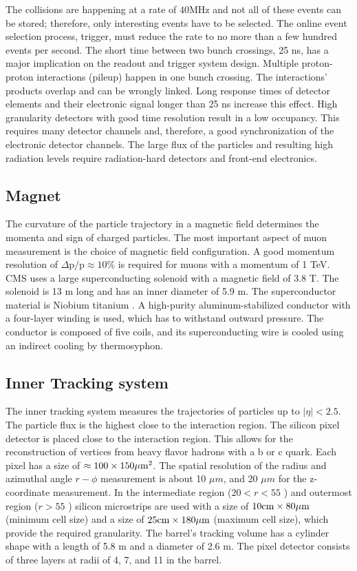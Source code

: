 The collisions are happening at a rate of $40 \mathrm{MHz}$ and not all of these events can be stored; therefore, only interesting events have to be selected. The online event selection process, trigger, must reduce the rate to no more than a few hundred events per second. The short time between two bunch crossings, 25 ns, has a major implication on the readout and trigger system design. Multiple proton-proton interactions (pileup) happen in one bunch crossing. The interactions' products overlap and can be wrongly linked. Long response times of detector elements and their electronic signal longer than 25 ns increase this effect. High granularity detectors with good time resolution result in a low occupancy. This requires many detector channels and, therefore, a good synchronization of the electronic detector channels. The large flux of the particles and resulting high radiation levels require radiation-hard detectors and front-end electronics.

\subsection{Magnet}

The curvature of the particle trajectory in a magnetic field determines the momenta and sign of charged particles. The most important aspect of muon measurement is the choice of magnetic field configuration. A good momentum resolution of $\Delta \mathrm{p} / \mathrm{p} \approx 10 \%$ is required for muons with a momentum of 1 TeV. CMS uses a large superconducting solenoid with a magnetic field of 3.8 T. The solenoid is 13 m long and has an inner diameter of 5.9 m. The superconductor material is Niobium titanium \cite{BUL-NA-2003-150}. A high-purity aluminum-stabilized conductor with a four-layer winding is used, which has to withstand outward pressure. The conductor is composed of five coils, and its superconducting wire is cooled using an indirect cooling by thermosyphon.

\subsection{Inner Tracking system}

The inner tracking system \cite{Khachatryan:2010pw} measures the trajectories of particles up to $|\eta| < 2.5$. The particle flux is the highest close to the interaction region. The silicon pixel detector is placed close to the interaction region. This allows for the reconstruction of vertices from heavy flavor hadrons with a b or c quark. Each pixel has a size of $\approx 100 \times 150 \mu \text{m}^{2}$. The spatial resolution of the radius and azimuthal angle $r-\phi$ measurement is about 10 $\mu m$, and 20 $\mu m$ for the z-coordinate measurement. In the intermediate region ($20 < r < 55$ \cm) and outermost region ($r > 55$ \cm) silicon microstrips are used with a size of $10 \text{cm} \times 80 \mu \text{m}$ (minimum cell size) and a size of $25 \text{cm} \times 180 \mu \text{m}$ (maximum cell size), which provide the required granularity. The barrel's tracking volume has a cylinder shape with a length of 5.8 m and a diameter of 2.6 m. The pixel detector consists of three layers at radii of 4, 7, and 11 \cm in the barrel.


